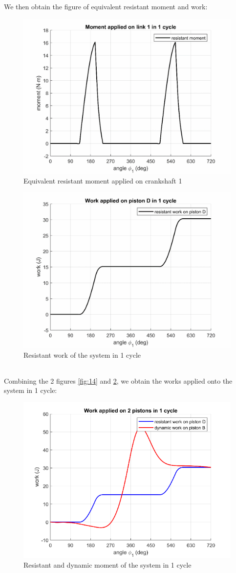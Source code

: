 We then obtain the figure of equivalent resistant moment and work:
\begin{figure}[h]
	\centering
	\includegraphics[width=0.66\linewidth]{16}
	\caption{Equivalent resistant moment applied on crankshaft 1}
	\label{fig:16}
\end{figure}
\begin{figure}[h]
	\centering
	\includegraphics[width=0.66\linewidth]{17}
	\caption{Resistant work of the system in 1 cycle}
	\label{fig:17}
\end{figure}\\
Combining the 2 figures \ref{fig:14} and \ref{fig:17}, we obtain the works applied onto the system in 1 cycle:
\begin{figure}
	\centering
	\includegraphics[width=0.6\linewidth]{18}
	\caption{Resistant and dynamic moment of the system in 1 cycle}
	\label{fig:18}
\end{figure}
